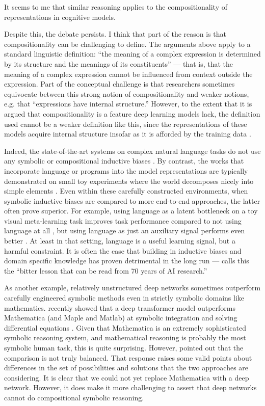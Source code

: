 It seems to me that similar reasoning applies to the compositionality of representations in cognitive models. \par
Despite this, the debate persists. I think that part of the reason is that compositionality can be challenging to define. The arguments above apply to a standard linguistic definition: ``the meaning of a complex expression is determined by its structure and the meanings of its constituents'' \citep{sep-compositionality} --- that is, that the meaning of a complex expression cannot be influenced from context outside the expression. Part of the conceptual challenge is that researchers sometimes equivocate between this strong notion of compositionality and weaker notions, e.g. that ``expressions have internal structure.'' However, to the extent that it is argued that compositionality is a feature deep learning models lack, the definition used cannot be a weaker definition like this, since the representations of these models acquire internal structure insofar as it is afforded by the training data \citep[e.g.][]{Mikolov2013}. \par
Indeed, the state-of-the-art systems on complex natural language tasks do not use any symbolic or compositional inductive biases \citep[e.g.][]{Radford2019,Raffel2019}. By contrast, the works that incorporate language or programs into the model representations are typically demonstrated on small toy experiments where the world decomposes nicely into simple elements \citep{Andreas2017,Mao2019}. Even within these carefully constructed environments, when symbolic inductive biases are compared to more end-to-end approaches, the latter often prove superior. For example, using language as a latent bottleneck on a toy visual meta-learning task improves task performance compared to not using language at all \citep{Andreas2017}, but using language as just an auxiliary signal performs even better \citep{Mu2019}. At least in that setting, language is a useful learning signal, but a harmful constraint. It is often the case that building in inductive biases and domain specific knowledge has proven detrimental in the long run --- \citet{Sutton2019} calls this the ``bitter lesson that can be read from 70 years of AI research.'' \par
As another example, relatively unstructured deep networks sometimes outperform carefully engineered symbolic methods even in strictly symbolic domains like mathematics. \citet{Lample2019} recently showed that a deep transformer model outperforms Mathematica (and Maple and Matlab) at symbolic integration and solving differential equations \citep{Lample2019}. Given that Mathematica is an extremely sophisticated symbolic reasoning system, and mathematical reasoning is probably the most symbolic human task, this is quite surprising. However, \citet{Davis2019} pointed out that the comparison is not truly balanced. That response raises some valid points about differences in the set of possibilities and solutions that the two approaches are considering. It is clear that we could not yet replace Mathematica with a deep network. However, it does make it more challenging to assert that deep networks cannot do compositional symbolic reasoning. \par

